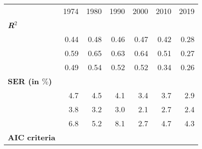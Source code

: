 \begin{tabular}{lllllll}
\cline{1-7}
\multicolumn{1}{c}{} &
  \multicolumn{1}{|r}{1974} &
  \multicolumn{1}{r}{1980} &
  \multicolumn{1}{r}{1990} &
  \multicolumn{1}{r}{2000} &
  \multicolumn{1}{r}{2010} &
  \multicolumn{1}{r}{2019} \\
\cline{1-7}
\multicolumn{1}{l}{\textbf{\textit{R}$^2$}} &
  \multicolumn{1}{|r}{} &
  \multicolumn{1}{r}{} &
  \multicolumn{1}{r}{} &
  \multicolumn{1}{r}{} &
  \multicolumn{1}{r}{} &
  \multicolumn{1}{r}{} \\
\multicolumn{1}{l}{\hspace{1em}{Model (A)}} &
  \multicolumn{1}{|r}{0.44} &
  \multicolumn{1}{r}{0.48} &
  \multicolumn{1}{r}{0.46} &
  \multicolumn{1}{r}{0.47} &
  \multicolumn{1}{r}{0.42} &
  \multicolumn{1}{r}{0.28} \\
\multicolumn{1}{l}{\hspace{1em}{Model (B)}} &
  \multicolumn{1}{|r}{0.59} &
  \multicolumn{1}{r}{0.65} &
  \multicolumn{1}{r}{0.63} &
  \multicolumn{1}{r}{0.64} &
  \multicolumn{1}{r}{0.51} &
  \multicolumn{1}{r}{0.27} \\
\multicolumn{1}{l}{\hspace{1em}{Model (C)}} &
  \multicolumn{1}{|r}{0.49} &
  \multicolumn{1}{r}{0.54} &
  \multicolumn{1}{r}{0.52} &
  \multicolumn{1}{r}{0.52} &
  \multicolumn{1}{r}{0.34} &
  \multicolumn{1}{r}{0.26} \\
\multicolumn{1}{l}{\textbf{SER (in $\%$)}} &
  \multicolumn{1}{|r}{} &
  \multicolumn{1}{r}{} &
  \multicolumn{1}{r}{} &
  \multicolumn{1}{r}{} &
  \multicolumn{1}{r}{} &
  \multicolumn{1}{r}{} \\
\multicolumn{1}{l}{\hspace{1em}{Model (A)}} &
  \multicolumn{1}{|r}{4.7} &
  \multicolumn{1}{r}{4.5} &
  \multicolumn{1}{r}{4.1} &
  \multicolumn{1}{r}{3.4} &
  \multicolumn{1}{r}{3.7} &
  \multicolumn{1}{r}{2.9} \\
\multicolumn{1}{l}{\hspace{1em}{Model (B)}} &
  \multicolumn{1}{|r}{3.8} &
  \multicolumn{1}{r}{3.2} &
  \multicolumn{1}{r}{3.0} &
  \multicolumn{1}{r}{2.1} &
  \multicolumn{1}{r}{2.7} &
  \multicolumn{1}{r}{2.4} \\
\multicolumn{1}{l}{\hspace{1em}{Model (C)}} &
  \multicolumn{1}{|r}{6.8} &
  \multicolumn{1}{r}{5.2} &
  \multicolumn{1}{r}{8.1} &
  \multicolumn{1}{r}{2.7} &
  \multicolumn{1}{r}{4.7} &
  \multicolumn{1}{r}{4.3} \\
\multicolumn{1}{l}{\textbf{AIC criteria}} &

\end{tabular}
